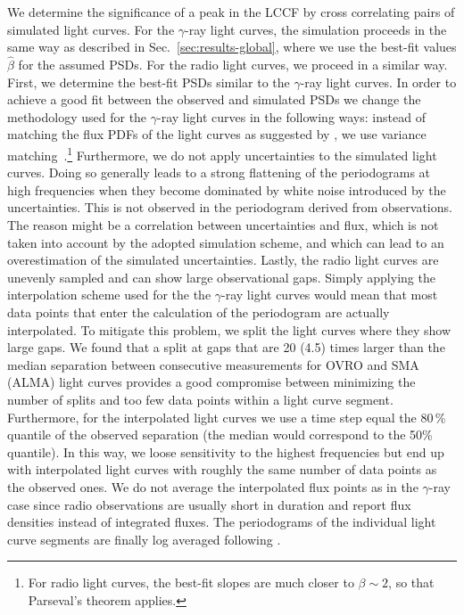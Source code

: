 \documentclass[twocolumn,linenumbers]{aastex62}
\newcommand{\gray}{$\gamma$-ray\xspace}
\begin{document}
We determine the significance of a peak in the LCCF by cross correlating pairs of simulated light curves. 
For the \gray light curves, the simulation proceeds in the same way as described in Sec.~\ref{sec:results-global}, where we use the best-fit values $\hat{\beta}$ for the assumed PSDs.
For the radio light curves, we proceed in a similar way. 
First, we determine the best-fit PSDs similar to the \gray light curves. 
In order to achieve a good fit between the observed and simulated PSDs we change the methodology used for the \gray light curves in the following ways:
instead of matching the flux PDFs of the light curves as suggested by \citet{2013MNRAS.433..907E}, we use variance matching~\citep{2014MNRAS.445..437M}.\footnote{For radio light curves, the best-fit slopes are much closer to $\beta \sim 2$, so that Parseval's theorem applies.}
Furthermore, we do not apply uncertainties to the simulated light curves. 
Doing so generally leads to a strong flattening of the periodograms at high frequencies when they become dominated by white noise introduced by the uncertainties. 
This is not observed in the periodogram derived from observations. 
The reason might be a correlation between uncertainties and flux, which is not taken into account by the adopted simulation scheme, and which can lead to an overestimation of the simulated uncertainties.
Lastly, the radio light curves are unevenly sampled and can show large observational gaps. 
Simply applying the interpolation scheme used for the the \gray light curves would mean that most data points that enter the calculation of the periodogram are actually interpolated. 
To mitigate this problem, we split the light curves where they show large gaps. 
We found that a split at gaps that are 20 (4.5) times larger than the median separation between consecutive measurements for OVRO and SMA (ALMA) light curves provides a good compromise between minimizing the number of splits and too few data points within a light curve segment. 
Furthermore, for the interpolated light curves we use a time step equal the 80\,\% quantile of the observed separation (the median would correspond to the 50\% quantile). 
In this way, we loose sensitivity to the highest frequencies but end up with interpolated light curves with roughly the same number of data points as the observed ones. 
We do not average the interpolated flux points as in the \gray case since radio observations are usually short in duration and report flux densities instead of integrated fluxes. 
The periodograms of the individual light curve segments are finally log averaged following \citet{1993MNRAS.261..612P}.
\end{document}

